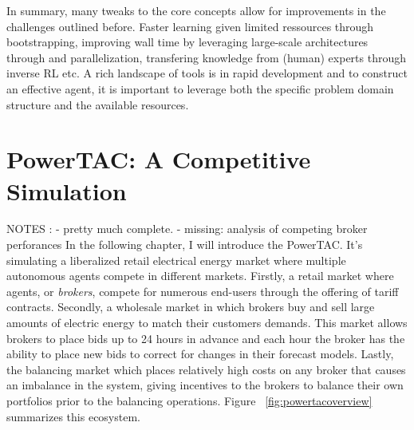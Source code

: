 In summary, many tweaks to the core concepts allow for improvements in the challenges outlined before. Faster learning given limited
ressources through bootstrapping, improving wall time by leveraging large-scale architectures through and
parallelization, transfering knowledge from (human) experts through inverse \ac{RL} etc. A rich landscape of tools is
in rapid development and to construct an effective agent, it is important to leverage both the specific problem domain
structure and the available resources.



\section{PowerTAC: A Competitive Simulation}%
\label{sec:powertac_a_competitive_simulation}




NOTES : 
    - pretty much complete.
    - missing: analysis of competing broker perforances
In the following chapter, I will introduce the \acf{PowerTAC}. It's simulating a liberalized retail electrical energy
market where multiple autonomous agents compete in different markets. Firstly, a retail market where agents, or
\emph{brokers}, compete for numerous end-users through the offering of tariff contracts. Secondly, a wholesale market in
which brokers buy and sell large amounts of electric energy to match their customers demands. This market allows brokers
to place bids up to 24 hours in advance and each hour the broker has the ability to place new bids to correct for
changes in their forecast models. Lastly, the balancing market which places relatively high costs on any broker that
causes an imbalance in the system, giving incentives to the brokers to balance their own portfolios prior to the
balancing operations. Figure ~\ref{fig:powertacoverview} summarizes this ecosystem.

